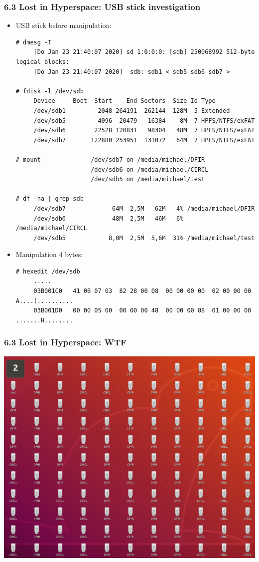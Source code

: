 \begin{frame}[fragile]
    \frametitle{6.3 Lost in Hyperspace: USB stick investigation}
    \begin{itemize}
            \item[] USB stick before manipulation:
\begin{lstlisting}[basicstyle=\tiny\ttfamily]
# dmesg -T
     [Do Jan 23 21:40:07 2020] sd 1:0:0:0: [sdb] 250068992 512-byte logical blocks: 
     [Do Jan 23 21:40:07 2020]  sdb: sdb1 < sdb5 sdb6 sdb7 >

# fdisk -l /dev/sdb
     Device     Boot  Start    End Sectors  Size Id Type
     /dev/sdb1         2048 264191  262144  128M  5 Extended
     /dev/sdb5         4096  20479   16384    8M  7 HPFS/NTFS/exFAT
     /dev/sdb6        22528 120831   98304   48M  7 HPFS/NTFS/exFAT
     /dev/sdb7       122880 253951  131072   64M  7 HPFS/NTFS/exFAT

# mount              /dev/sdb7 on /media/michael/DFIR
                     /dev/sdb6 on /media/michael/CIRCL
                     /dev/sdb5 on /media/michael/test

# df -ha | grep sdb
     /dev/sdb7             64M  2,5M   62M   4% /media/michael/DFIR
     /dev/sdb6             48M  2,5M   46M   6% /media/michael/CIRCL
     /dev/sdb5            8,0M  2,5M  5,6M  31% /media/michael/test
\end{lstlisting}
            \item[] Manipulation 4 bytes:
\begin{lstlisting}[basicstyle=\tiny\ttfamily]
# hexedit /dev/sdb
     .....
     03B001C0   41 0B 07 03  82 28 00 08  00 00 00 00  02 00 00 00  A....(..........
     03B001D0   00 00 05 00  00 00 00 48  00 00 00 88  01 00 00 00  .......H........
\end{lstlisting}
    \end{itemize}
\end{frame}


\begin{frame}[fragile]
    \frametitle{6.3 Lost in Hyperspace: WTF}
    \includegraphics[scale=0.2]{images/ebr.png}
\end{frame}


